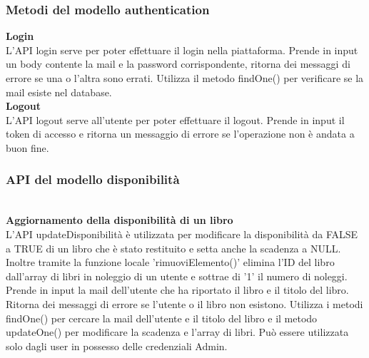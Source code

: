 \documentclass{article}
\begin{document}
\subsubsection{Metodi del modello authentication}
\noindent \textbf{Login}\\
L'API login serve per poter effettuare il login nella piattaforma. Prende in input un body contente la mail e la password corrispondente, ritorna dei messaggi di errore se una o l'altra sono errati. Utilizza il metodo findOne() per verificare se la mail esiste nel database. \\

\noindent \textbf{Logout}\\
L'API logout serve all'utente per poter effettuare il logout. Prende in input il token di accesso e ritorna un messaggio di errore se l'operazione non è andata a buon fine.\\

\subsubsection{API del modello disponibilità}\\

\noindent \textbf{Aggiornamento della disponibilità di un libro}\\
L'API updateDisponibilità è utilizzata per modificare la disponibilità da FALSE a TRUE di un libro che è stato restituito e setta anche la scadenza a NULL. Inoltre tramite la funzione locale 'rimuoviElemento()' elimina l'ID del libro dall'array di libri in noleggio di un utente e sottrae di '1' il numero di noleggi. 
Prende in input la mail dell'utente che ha riportato il libro e il titolo del libro. Ritorna dei messaggi di errore se l'utente o il libro non esistono. Utilizza i metodi findOne() per cercare la mail dell'utente e il titolo del libro e il metodo updateOne() per modificare la scadenza e l'array di libri. Può essere utilizzata solo dagli user in possesso delle credenziali Admin. \\
\end{document}
